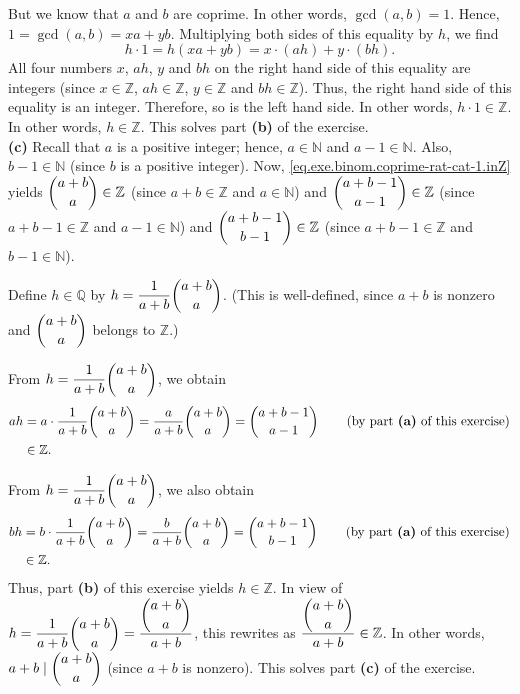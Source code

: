 \documentclass[paper=a4, fontsize=12pt]{scrartcl}%
\theoremstyle{plainsl}
\theoremstyle{definition}
\theoremstyle{remark}
\begin{document}
But we know that $a$ and $b$ are coprime. In other words, $\gcd\left(
a,b\right)  =1$. Hence, $1=\gcd\left(  a,b\right)  =xa+yb$. Multiplying both
sides of this equality by $h$, we find%
\[
h\cdot1=h\left(  xa+yb\right)  =x\cdot\left(  ah\right)  +y\cdot\left(
bh\right)  .
\]
All four numbers $x$, $ah$, $y$ and $bh$ on the right hand side of this
equality are integers (since $x\in\mathbb{Z}$, $ah\in\mathbb{Z}$,
$y\in\mathbb{Z}$ and $bh\in\mathbb{Z}$). Thus, the right hand side of this
equality is an integer. Therefore, so is the left hand side. In other words,
$h\cdot1\in\mathbb{Z}$. In other words, $h\in\mathbb{Z}$. This solves part
\textbf{(b)} of the exercise. \\[0.4cm]

\textbf{(c)} Recall that $a$ is a positive integer; hence, $a\in\mathbb{N}$
and $a-1\in\mathbb{N}$. Also, $b-1\in\mathbb{N}$ (since $b$ is a positive
integer). Now, \eqref{eq.exe.binom.coprime-rat-cat-1.inZ} yields $\dbinom
{a+b}{a}\in\mathbb{Z}$ (since $a+b\in\mathbb{Z}$ and $a\in\mathbb{N}$) and
$\dbinom{a+b-1}{a-1}\in\mathbb{Z}$ (since $a+b-1\in\mathbb{Z}$ and
$a-1\in\mathbb{N}$) and $\dbinom{a+b-1}{b-1}\in\mathbb{Z}$ (since
$a+b-1\in\mathbb{Z}$ and $b-1\in\mathbb{N}$).

Define $h\in\mathbb{Q}$ by $h=\dfrac{1}{a+b}\dbinom{a+b}{a}$. (This is
well-defined, since $a+b$ is nonzero and $\dbinom{a+b}{a}$ belongs to
$\mathbb{Z}$.)

From $h=\dfrac{1}{a+b}\dbinom{a+b}{a}$, we obtain%
\begin{align*}
ah  &  =a\cdot\dfrac{1}{a+b}\dbinom{a+b}{a}=\dfrac{a}{a+b}\dbinom{a+b}%
{a}=\dbinom{a+b-1}{a-1}\qquad\left(  \text{by part \textbf{(a)} of this
exercise}\right) \\
&  \in\mathbb{Z}.
\end{align*}


From $h=\dfrac{1}{a+b}\dbinom{a+b}{a}$, we also obtain%
\begin{align*}
bh  &  =b\cdot\dfrac{1}{a+b}\dbinom{a+b}{a}=\dfrac{b}{a+b}\dbinom{a+b}%
{a}=\dbinom{a+b-1}{b-1}\qquad\left(  \text{by part \textbf{(a)} of this
exercise}\right) \\
&  \in\mathbb{Z}.
\end{align*}
Thus, part \textbf{(b)} of this exercise yields $h\in\mathbb{Z}$. In view of
$h=\dfrac{1}{a+b}\dbinom{a+b}{a}=\dfrac{\dbinom{a+b}{a}}{a+b}$, this rewrites
as $\dfrac{\dbinom{a+b}{a}}{a+b}\in\mathbb{Z}$. In other words, $a+b\mid
\dbinom{a+b}{a}$ (since $a+b$ is nonzero). This solves part \textbf{(c)} of
the exercise. \\[0.4cm]
\end{document}
